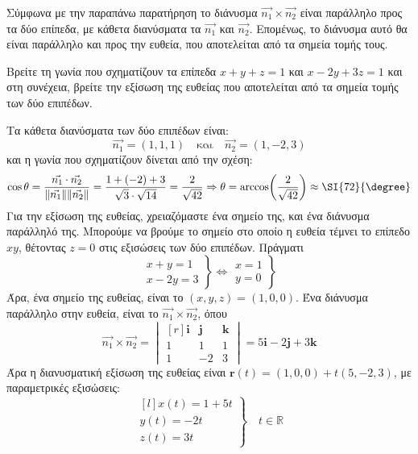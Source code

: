 \begin{rem}
  Σύμφωνα με την παραπάνω παρατήρηση το διάνυσμα 
  $ \vec{n_{1}} \times \vec{n_{2}} $ είναι παράλληλο προς τα δύο επίπεδα, με κάθετα 
  διανύσματα τα $ \vec{n_{1}} $ και $ \vec{n_{2}} $. Επομένως, το διάνυσμα αυτό 
  θα είναι παράλληλο και προς την ευθεία, που αποτελείται από τα σημεία τομής τους.
\end{rem}

\begin{example}
  Βρείτε τη γωνία που σχηματίζουν τα επίπεδα $ x+y+z=1 $ και $ x-2y+3z=1 $ και 
  στη συνέχεια, βρείτε την εξίσωση της ευθείας που αποτελείται από τα σημεία τομής 
  των δύο επιπέδων.
\end{example}
\begin{solution}
  Τα κάθετα διανύσματα των δύο επιπέδων είναι:
  \[
    \vec{n_{1}} = (1,1,1) \quad \text{και} \quad \vec{n_{2}} = (1,-2,3) 
  \]
  και η γωνία που σχηματίζουν δίνεται από την σχέση:
  \[
    \cos{\theta} = \frac{\vec{n_{1}} \cdot \vec{n_{2}}}{\norm{\vec{n_{1}}}
    \norm{\vec{n_{2}}}} = \frac{1+(-2)+3}{\sqrt{3}\cdot \sqrt{14}} =
    \frac{2}{\sqrt{42}} \Rightarrow \theta = \arccos(\frac{2}{\sqrt{42}}) \approx 
    \SI{72}{\degree} 
  \] 
  Για την εξίσωση της ευθείας, χρειαζόμαστε ένα σημείο της, και ένα διάνυσμα 
  παράλληλό της. Μπορούμε να βρούμε το σημείο στο οποίο η ευθεία τέμνει το επίπεδο 
  $ xy $, θέτοντας $ z=0 $ στις εξισώσεις των δύο επιπέδων. Πράγματι 
  \[
    \left.
      \begin{matrix}
        x+y=1 \\
        x-2y=3
      \end{matrix} 
    \right\} \Leftrightarrow 
    \left.
      \begin{matrix}
        x=1 \\
        y=0
      \end{matrix} 
    \right\} 
  \] 
  Άρα, ένα σημείο της ευθείας, είναι το $ (x,y,z) = (1,0,0) $.
  Ένα διάνυσμα παράλληλο στην ευθεία, είναι το $ \vec{n_{1}} \times \vec{n_{2}} $, 
  όπου
  \[
    \vec{n_{1}} \times \vec{n_{2}} = 
    \begin{vmatrix*}[r]
      \mathbf{i} & \mathbf{j} & \mathbf{k} \\
      1 & 1 & 1 \\
      1 & -2 & 3
    \end{vmatrix*} = 5 \mathbf{i}- 2 \mathbf{j}+ 3 \mathbf{k} 
  \] 
  Άρα η διανυσματική εξίσωση της ευθείας είναι 
  $ \mathbf{r}(t) = (1,0,0) + t(5,-2,3) $, με παραμετρικές εξισώσεις:
  \[
    \left.
      \begin{matrix*}[l]
        x(t) = 1+5t \\
        y(t) = -2t \\
        z(t) = 3t
      \end{matrix*} 
    \right\} \quad t \in \mathbb{R}
  \]
\end{solution}




